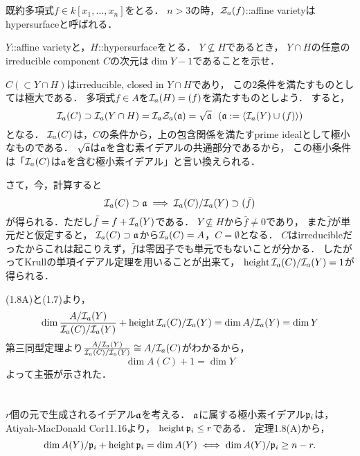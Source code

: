 \documentclass[a4paper]{jsarticle}
\begin{document}
\section{}
    既約多項式$f \in k[x_1, \dots, x_n]$をとる．
    $n>3$の時，$\mathcal{Z}_a(f)$::affine varietyはhypersurfaceと呼ばれる．
    \begin{screen}
        $Y$::affine varietyと，$H$::hypersurfaceをとる．
        $Y \not \subseteq H$であるとき，
        $Y \cap H$の任意のirreducible component $C$の次元は$\dim Y-1$であることを示せ．
    \end{screen}
    $C (\subset Y \cap H)$はirreducible, closed in $Y \cap H$であり，
    この2条件を満たすものとしては極大である．
    多項式$f \in A$を$\mathcal{I}_a(H)=(f)$を満たすものとしよう．
    すると，
    \[
        \mathcal{I}_a(C) \supset \mathcal{I}_a(Y \cap H)=\mathcal{I}_a \mathcal{Z}_a (\mathfrak{a})=\sqrt{\mathfrak{a}}
        ~~ (\mathfrak{a}:=\langle \mathcal{I}_a(Y) \cup (f)\rangle)
    \]
    となる．
    $\mathcal{I}_a(C)$は，$C$の条件から，上の包含関係を満たすprime idealとして極小なものである．
    $\sqrt{\mathfrak{a}}$は$\mathfrak{a}$を含む素イデアルの共通部分であるから，
    この極小条件は「$\mathcal{I}_a(C)$は$\mathfrak{a}$を含む極小素イデアル」と言い換えられる．

    さて，今，計算すると
    \[ \mathcal{I}_a(C) \supset \mathfrak{a} \implies \mathcal{I}_a(C)/\mathcal{I}_a(Y) \supset (\bar{f}) \]
    が得られる．ただし$\bar{f}=f+\mathcal{I}_a(Y)$である．
    $Y \not \subseteq H$から$\bar{f} \neq 0$であり，
    また$\bar{f}$が単元だと仮定すると，
    $\mathcal{I}_a(C) \supset \mathfrak{a}$から$\mathcal{I}_a(C)=A$，$C=\emptyset$となる．
    $C$はirreducibleだったからこれは起こりえず，$\bar{f}$は零因子でも単元でもないことが分かる．
    したがってKrullの単項イデアル定理を用いることが出来て，
    $\operatorname{height} \mathcal{I}_a(C)/\mathcal{I}_a(Y)=1$が得られる．

    (1.8A)と(1.7)より，
    \[ \dim \frac{A/\mathcal{I}_a(Y)}{\mathcal{I}_a(C)/\mathcal{I}_a(Y)}+\operatorname{height} \mathcal{I}_a(C)/\mathcal{I}_a(Y)=\dim A/\mathcal{I}_a(Y)=\dim Y \]
    第三同型定理より$\frac{A/\mathcal{I}_a(Y)}{\mathcal{I}_a(C)/\mathcal{I}_a(Y)} \cong A/\mathcal{I}_a(C)$がわかるから，
    \[ \dim A(C)+1=\dim Y \]
    よって主張が示された．

\section{}
    $r$個の元で生成されるイデアル$\mathfrak{a}$を考える．
    $\mathfrak{a}$に属する極小素イデアル$\mathfrak{p}_i$は，Atiyah-MacDonald Cor11.16より，
    $\operatorname{height} \mathfrak{p}_i \leq r$である．
    定理1.8(A)から，
    \[ \dim A(Y)/\mathfrak{p}_i+\operatorname{height} \mathfrak{p}_i=\dim A(Y) \iff \dim A(Y)/\mathfrak{p}_i \geq n-r. \]

\section{} %
\end{document}
